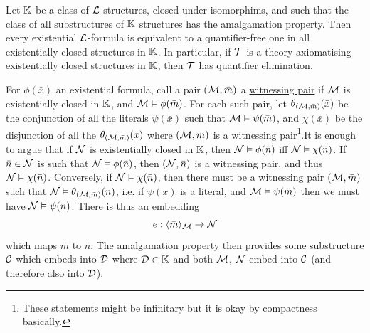 \documentclass{article}
\numberwithin{thm}{subsection}
\begin{document}
\begin{fancythm}{}
    Let $\mathbb{K}$ be a class of $\mathcal{L}$-structures, closed under isomorphims, and such that the class of all substructures of $\mathbb{K}$ structures has the amalgamation property. Then every existential $\mathcal{L}$-formula is equivalent to a quantifier-free one in all existentially closed structures in $\mathbb{K}$. \gap In particular, if $\mathcal{T}$ is a theory axiomatising existentially closed structures in $\mathbb{K}$, then $\mathcal{T}$ has quantifier elimination.
\end{fancythm}
\proof For $\phi(\bar x)$ an existential formula, call a pair $(\mathcal{M}, \bar m)$ a \underline{witnessing pair} if $\mathcal{M}$ is existentially closed in $\mathbb{K}$, and $\mathcal{M} \vDash \phi ( \bar m )$. For each such pair, let $\theta_{(\mathcal{M},\bar m)}(\bar x)$ be the conjunction of all the literals $\psi(\bar x)$ such that $\mathcal{M} \vDash \psi( \bar m )$, and $\chi( \bar x )$  be the disjunction of all the $\theta_{(\mathcal{M}, \bar m)}(\bar x)$ where $(\mathcal{M}, \bar m)$ is a witnessing pair\footnote{These statements might be infinitary but it is okay by compactness basically.}.\gap It is enough to argue that if $\mathcal{N}$ is existentially closed in $\mathbb{K}$, then $\mathcal{N} \vDash \phi(\bar n)$ iff $\mathcal{N} \vDash \chi(\bar n)$. If $\bar n \in \mathcal{N}$ is such that $\mathcal{N} \vDash \phi(\bar n)$, then $(\mathcal{N}, \bar n)$ is a witnessing pair, and thus $\mathcal{N} \vDash \chi( \bar n)$. \gap Conversely, if $\mathcal{N} \vDash \chi(\bar n)$, then there must be a witnessing pair $(\mathcal{M}, \bar m)$ such that $\mathcal{N} \vDash \theta_{(\mathcal{M}, \bar m)}(\bar n)$, i.e. if $\psi(\bar x)$ is a literal, and $\mathcal{M} \vDash \psi(\bar m)$ then we must have $\mathcal{N} \vDash \psi( \bar n)$. There is thus an embedding \[ e: \langle \bar m \rangle_{\mathcal{M}} \to \mathcal{N}\] which maps $\bar m$ to $\bar n$. The amalgamation property then provides some substructure $\mathcal{C}$ which embeds into $\mathcal{D}$ where $\mathcal{D} \in \mathbb{K}$ and both $\mathcal{M}$, $\mathcal{N}$ embed into $\mathcal{C}$ (and therefore also into $\mathcal{D}$). \\
\begin{center}
\end{center}
\end{document}
